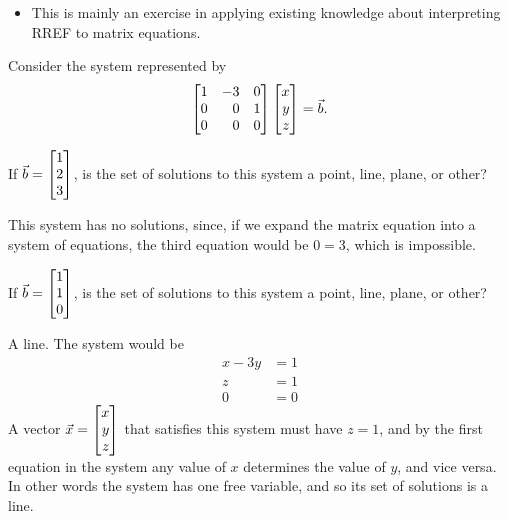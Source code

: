 \documentclass{workbook}
\begin{document}
\begin{slide}
\begin{annotation}
		\begin{notes}
			\begin{itemize}
				\item This is mainly an exercise in applying existing knowledge about
					interpreting RREF to matrix equations.
			\end{itemize}
		\end{notes}
	\end{annotation}
	Consider the system represented by
	\[
		\mat{1&-3&0\\0&0&1\\0&0&0}\mat{x\\y\\z}=\vec b.
	\]
	\begin{parts}
		\item If $\vec b=\mat{1\\2\\3}$, is the set of solutions to this system
			a point, line, plane, or other?
			\begin{solution}
				This system has no solutions, since, if we expand the matrix
				equation into a system of equations, the third equation would be
				$0=3$, which is impossible.
			\end{solution}
		\item If $\vec b=\mat{1\\1\\0}$, is the set of solutions to this system
			a point, line, plane, or other?
			\begin{solution}
				A line. The system would be
				\begin{align*}
					x - 3y &= 1 \\
					z &= 1 \\
					0 &= 0
				\end{align*}
				A vector $\vec x=\mat{x\\y\\z}$ that satisfies this system must have
				$z=1$, and by the first equation in the system any value of $x$
				determines the value of $y$, and vice versa. In other words the
				system has one free variable, and so its set of solutions is a line.
			\end{solution}
	\end{parts}

\end{slide}
\end{document}
